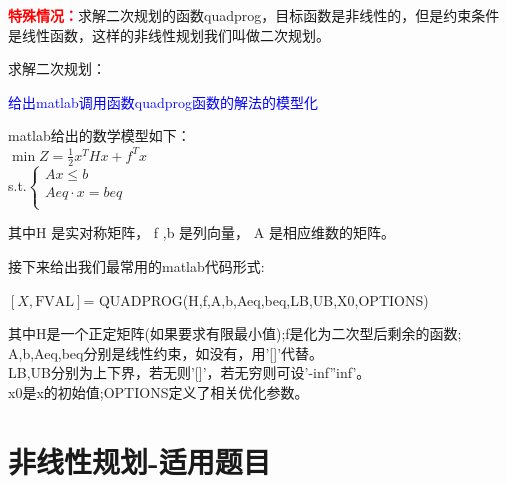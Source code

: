 \documentclass[a4paper,20pt]{article}
\begin{document}
\par \noindent  \textbf{\textcolor{red}{特殊情况：}}求解二次规划的函数quadprog，目标函数是非线性的，但是约束条件是线性函数，这样的非线性规划我们叫做二次规划。
\par 求解二次规划：
\par \noindent
{}
\par \noindent \textcolor{blue}{给出matlab调用函数quadprog函数的解法的模型化}
\par \noindent matlab给出的数学模型如下：
\\$\min Z=\frac{1}{2}x^THx+f^Tx$
    \\s.t.$\left\{\begin{matrix}
    Ax\leq b         \\
    Aeq\cdot x = beq \\
\end{matrix} \right.$
    \par 其中H 是实对称矩阵， f ,b 是列向量， A 是相应维数的矩阵。
    \par 接下来给出我们最常用的matlab代码形式:
    \begin{center}
        $\left[X,\text{FVAL}\right]$= QUADPROG(H,f,A,b,Aeq,beq,LB,UB,X0,OPTIONS)
    \end{center}
    其中H是一个正定矩阵(如果要求有限最小值);f是化为二次型后剩余的函数;
    \\A,b,Aeq,beq分别是线性约束，如没有，用'[]'代替。
    \\LB,UB分别为上下界，若无则'[]'，若无穷则可设'-inf''inf'。
    \\x0是x的初始值;OPTIONS定义了相关优化参数。
    \section{非线性规划-适用题目}
\end{document}
